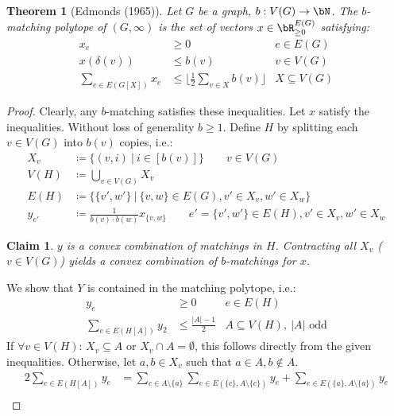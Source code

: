 \documentclass[11pt, a4paper]{article}
\newcommand{\floor}[1]{\lfloor #1 \rfloor}
\newcommand{\abs}[1]{\left\lvert#1\right\rvert}
\newcommand{\set}[1]{\{#1\}}
\newtheorem{theorem}{Theorem}[section]
\newtheorem*{claim}{Claim}
\theoremstyle{remark}
\theoremstyle{definition}
\begin{document}
\begin{theorem}[Edmonds (1965)]
	Let $G$ be a graph, $b: V(G)\to\bN$. The $b$-matching polytope of $(G,\infty)$
	is the set of vectors $x\in \bR^{E(G)}_{\geq0}$ satisfying:
	\begin{align*}
		x_e                    & \geq0                                     & e\in E(G)       \\
		x(\delta(v))           & \leq b(v)                                 & v\in V(G)       \\
		\sum_{e\in E(G[X])}x_e & \leq \floor{\frac{1}{2}\sum_{v\in X}b(v)} & X\subseteq V(G)
	\end{align*}
\end{theorem}
\begin{proof}
	Clearly, any $b$-matching satisfies these inequalities. Let $x$ satisfy
	the inequalities. Without loss of generality $b\geq1$. Define $H$ by
	splitting each $v\in V(G)$ into $b(v)$ copies, i.e.:
	\begin{align*}
		X_v    & \coloneqq \set{(v,i)\ |\ i\in [b(v)]} \qquad v\in V(G)                                             \\
		V(H)   & \coloneqq \bigcup_{v\in V(G)}X_v                                                                   \\
		E(H)   & \coloneqq \set{\set{v',w'}\ |\ \set{v,w}\in E(G),v'\in X_v,w'\in X_w}                              \\
		y_{e'} & \coloneqq \frac{1}{b(v)\cdot b(w)} x_{\set{v,w}} \qquad e'=\set{v',w'}\in E(H),v'\in X_v,w'\in X_w
	\end{align*}
	\begin{claim}
		$y$ is a convex combination of matchings in $H$. Contracting all $X_v$
		($v\in V(G)$) yields a convex combination of $b$-matchings for $x$.
	\end{claim}
	We show that $Y$ is contained in the matching polytope, i.e.:
	\begin{align*}
		y_e                    & \geq0                    & e\in E(H)                            \\
		\sum_{e\in E(H[A])}y_2 & \leq \frac{\abs{A}-1}{2} & A\subseteq V(H),\ \abs{A}\text{ odd}
	\end{align*}
	If $\forall v\in V(H)$: $X_v\subseteq A$ or $X_v\cap A=\emptyset$, this
	follows directly from the given inequalities. Otherwise, let $a,b\in X_v$
	such that $a\in A,b\notin A$.
	\begin{align*}
		2\sum_{e\in E(H[A])}y_e & =\sum_{c\in A\setminus\set{a}}\sum_{e\in E(\set{c},A\setminus\set{c})}y_e + \sum_{e\in E(\set{a},A\setminus\set{a})}y_e                                              \\

\end{align*}
\end{proof}
\end{document}

